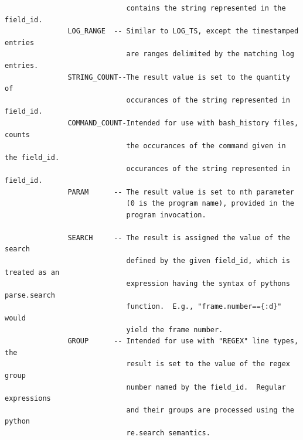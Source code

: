 \documentclass[12pt]{article}
\begin{document}
\begin{verbatim}
                             contains the string represented in the field_id.
               LOG_RANGE  -- Similar to LOG_TS, except the timestamped entries
                             are ranges delimited by the matching log entries.
               STRING_COUNT--The result value is set to the quantity of
                             occurances of the string represented in field_id.
               COMMAND_COUNT-Intended for use with bash_history files, counts
                             the occurances of the command given in the field_id.
                             occurances of the string represented in field_id.
               PARAM      -- The result value is set to nth parameter
                             (0 is the program name), provided in the 
                             program invocation.  
                             
               SEARCH     -- The result is assigned the value of the search 
                             defined by the given field_id, which is treated as an
                             expression having the syntax of pythons parse.search 
                             function.  E.g., "frame.number=={:d}" would 
                             yield the frame number.
               GROUP      -- Intended for use with "REGEX" line types, the 
                             result is set to the value of the regex group 
                             number named by the field_id.  Regular expressions
                             and their groups are processed using the python
                             re.search semantics.
                             

\end{verbatim}
\end{document}
